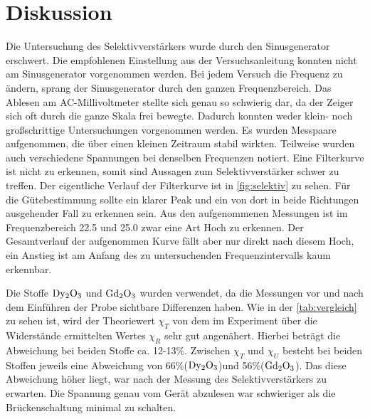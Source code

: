 \section{Diskussion}
\label{sec:Diskussion}

Die Untersuchung des Selektivverstärkers wurde durch den Sinusgenerator erschwert.
Die empfohlenen Einstellung aus der Versuchsanleitung konnten nicht am Sinusgenerator vorgenommen werden.
Bei jedem Versuch die Frequenz zu ändern, sprang der Sinusgenerator durch den ganzen Frequenzbereich.
Das Ablesen am AC-Millivoltmeter stellte sich genau so schwierig dar, da der Zeiger sich oft durch die ganze Skala frei bewegte.
Dadurch konnten weder klein- noch großschrittige Untersuchungen vorgenommen werden.
Es wurden Messpaare aufgenommen, die über einen kleinen Zeitraum stabil wirkten.
Teilweise wurden auch verschiedene Spannungen bei denselben Frequenzen notiert.
Eine Filterkurve ist nicht zu erkennen, somit sind Aussagen zum Selektivverstärker schwer zu treffen.
Der eigentliche Verlauf der Filterkurve ist in \autoref{fig:selektiv} zu sehen. 
Für die Gütebestimmung sollte ein klarer Peak und ein von dort in beide Richtungen ausgehender Fall zu erkennen sein.
Aus den aufgenommenen Messungen ist im Frequenzbereich 22.5 und 25.0 zwar eine Art Hoch zu erkennen.
Der Gesamtverlauf der aufgenommen Kurve fällt aber nur direkt nach diesem Hoch, ein Anstieg ist am Anfang des zu untersuchenden Frequenzintervalls kaum erkennbar.

\noindent
Die Stoffe $\ce{Dy2O3}$ und $\ce{Gd2O3}$ wurden verwendet, da die Messungen vor und nach dem Einführen der Probe sichtbare Differenzen haben.
Wie in der \autoref{tab:vergleich} zu sehen ist, wird der Theoriewert $\chi_T$ von dem im Experiment über die Widerstände ermittelten Wertes $\chi_R$ sehr gut angenähert.
Hierbei beträgt die Abweichung bei beiden Stoffe ca. 12-13\%.
Zwischen $\chi_T$ und $\chi_U$ besteht bei beiden Stoffen jeweils eine Abweichung von 66\%($\ce{Dy2O3}$)und 56\%($\ce{Gd2O3}$).
Das diese Abweichung höher liegt, war nach der Messung des Selektivverstärkers zu erwarten.
Die Spannung genau vom Gerät abzulesen war schwieriger als die Brückenschaltung minimal zu schalten.

